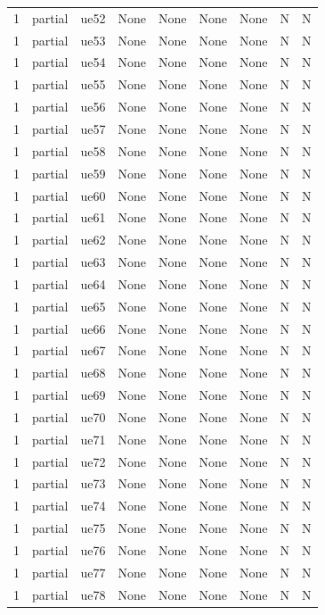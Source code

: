 \begin{table}[ht]
\begin{tabular}{|c|c|c|c|c|c|c|c|c|}
1 & partial & ue52 & None & None & None & None & N & N \\
1 & partial & ue53 & None & None & None & None & N & N \\
1 & partial & ue54 & None & None & None & None & N & N \\
1 & partial & ue55 & None & None & None & None & N & N \\
1 & partial & ue56 & None & None & None & None & N & N \\
1 & partial & ue57 & None & None & None & None & N & N \\
1 & partial & ue58 & None & None & None & None & N & N \\
1 & partial & ue59 & None & None & None & None & N & N \\
1 & partial & ue60 & None & None & None & None & N & N \\
1 & partial & ue61 & None & None & None & None & N & N \\
1 & partial & ue62 & None & None & None & None & N & N \\
1 & partial & ue63 & None & None & None & None & N & N \\
1 & partial & ue64 & None & None & None & None & N & N \\
1 & partial & ue65 & None & None & None & None & N & N \\
1 & partial & ue66 & None & None & None & None & N & N \\
1 & partial & ue67 & None & None & None & None & N & N \\
1 & partial & ue68 & None & None & None & None & N & N \\
1 & partial & ue69 & None & None & None & None & N & N \\
1 & partial & ue70 & None & None & None & None & N & N \\
1 & partial & ue71 & None & None & None & None & N & N \\
1 & partial & ue72 & None & None & None & None & N & N \\
1 & partial & ue73 & None & None & None & None & N & N \\
1 & partial & ue74 & None & None & None & None & N & N \\
1 & partial & ue75 & None & None & None & None & N & N \\
1 & partial & ue76 & None & None & None & None & N & N \\
1 & partial & ue77 & None & None & None & None & N & N \\
1 & partial & ue78 & None & None & None & None & N & N \\

\end{tabular}
\end{table}
